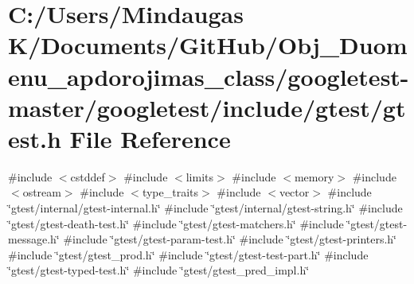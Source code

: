 \hypertarget{googletest-master_2googletest_2include_2gtest_2gtest_8h}{}\section{C\+:/\+Users/\+Mindaugas K/\+Documents/\+Git\+Hub/\+Obj\+\_\+\+Duomenu\+\_\+apdorojimas\+\_\+class/googletest-\/master/googletest/include/gtest/gtest.h File Reference}
\label{googletest-master_2googletest_2include_2gtest_2gtest_8h}
{\ttfamily \#include $<$cstddef$>$}\newline
{\ttfamily \#include $<$limits$>$}\newline
{\ttfamily \#include $<$memory$>$}\newline
{\ttfamily \#include $<$ostream$>$}\newline
{\ttfamily \#include $<$type\+\_\+traits$>$}\newline
{\ttfamily \#include $<$vector$>$}\newline
{\ttfamily \#include \char`\"{}gtest/internal/gtest-\/internal.\+h\char`\"{}}\newline
{\ttfamily \#include \char`\"{}gtest/internal/gtest-\/string.\+h\char`\"{}}\newline
{\ttfamily \#include \char`\"{}gtest/gtest-\/death-\/test.\+h\char`\"{}}\newline
{\ttfamily \#include \char`\"{}gtest/gtest-\/matchers.\+h\char`\"{}}\newline
{\ttfamily \#include \char`\"{}gtest/gtest-\/message.\+h\char`\"{}}\newline
{\ttfamily \#include \char`\"{}gtest/gtest-\/param-\/test.\+h\char`\"{}}\newline
{\ttfamily \#include \char`\"{}gtest/gtest-\/printers.\+h\char`\"{}}\newline
{\ttfamily \#include \char`\"{}gtest/gtest\+\_\+prod.\+h\char`\"{}}\newline
{\ttfamily \#include \char`\"{}gtest/gtest-\/test-\/part.\+h\char`\"{}}\newline
{\ttfamily \#include \char`\"{}gtest/gtest-\/typed-\/test.\+h\char`\"{}}\newline
{\ttfamily \#include \char`\"{}gtest/gtest\+\_\+pred\+\_\+impl.\+h\char`\"{}}\newline

